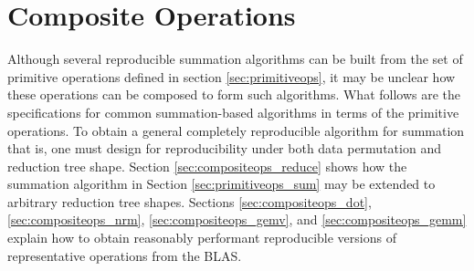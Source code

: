 \section{Composite Operations}
  \label{sec:compositeops}
  Although several reproducible summation algorithms can be built from the set of primitive operations defined in section \ref{sec:primitiveops}, it may be unclear how these operations can be composed to form such algorithms. What follows are the specifications for common summation-based algorithms in terms of the primitive operations.
  To obtain a general completely reproducible algorithm for summation that is, one must design for reproducibility under both data permutation and reduction tree shape.
  Section \ref{sec:compositeops_reduce} shows how the summation algorithm in Section \ref{sec:primitiveops_sum} may be extended to arbitrary reduction tree shapes. Sections \ref{sec:compositeops_dot}, \ref{sec:compositeops_nrm}, \ref{sec:compositeops_gemv}, and \ref{sec:compositeops_gemm} explain how to obtain reasonably performant reproducible versions of representative operations from the BLAS.
    
    
    
    
    
